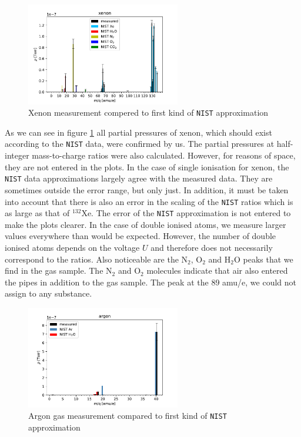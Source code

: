     
    \begin{figure}[h!]
        \centering
        \includegraphics[width=0.6\textwidth]{Report/DataResultsPlots/Xenon.pdf}
        \caption{Xenon measurement compered to first kind of \texttt{NIST} approximation}
        \label{fig:xenon}
    \end{figure}
        As we can see in figure \ref{fig:xenon}
    all partial pressures of xenon, which should exist according to the \texttt{NIST} data, were confirmed by us. The partial pressures at half-integer mass-to-charge ratios were also calculated. However, for reasons of space, they are not entered in the plots. In the case of single ionisation for xenon, the \texttt{NIST} data approximations largely agree with the measured data. They are sometimes outside the error range, but only just. In addition, it must be taken into account that there is also an error in the scaling of the \texttt{NIST} ratios which is as large as that of $^{132}$Xe. The error of the \texttt{NIST} approximation is not entered to make the plots clearer. In the case of double ionised atoms, we measure larger values everywhere than would be expected. However, the number of double ionised atoms depends on the voltage $U$ and therefore does not necessarily correspond to the  ratios. Also noticeable are the N$_2$, O$_2$ and H$_2$O peaks that we find in the gas sample. The N$_2$ and O$_2$ molecules indicate that air also entered the pipes in addition to the gas sample.
    The peak at the 89 amu/e, we could not assign to any substance.
    
    \begin{figure}[h!]
        \centering
        \includegraphics[width=0.6\textwidth]{Report/DataResultsPlots/Argon.pdf}
        \caption{Argon gas measurement compared to first kind of \texttt{NIST} approximation}
        \label{fig:argon}
    \end{figure}
   
